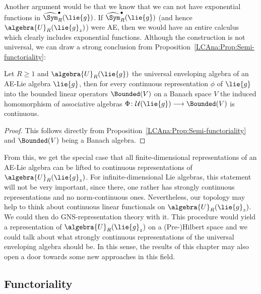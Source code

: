 Another argument would be that we know that we can not have exponential 
functions in $\widehat{\Sym}_R^{\bullet}(\lie{g})$. If 
$\widehat{\Sym}_R^{\bullet}(\lie{g})$ (and hence $\algebra{U}_R(\lie{g}_z)$) 
were AE, then we would have an entire calculus which clearly includes 
exponential functions. Although the construction is not universal, we can draw 
a strong conclusion from Proposition~\ref{LCAna:Prop:Semi-functoriality}:
\begin{corollary}
    \label{LCAna:Coro:ContinuousRepresentations}%
    Let $R \geq 1$ and $\algebra{U}_R(\lie{g})$ the universal
    enveloping algebra of an AE-Lie algebra $\lie{g}$, then for every
    continuous representation $\phi$ of $\lie{g}$ into the bounded
    linear operators $\Bounded(V)$ on a Banach space $V$ the induced
    homomorphism of associative algebras $\Phi \colon
    \mathcal{U}(\lie{g}) \longrightarrow \Bounded(V)$ is continuous.
\end{corollary}
\begin{proof}
    This follows directly from
    Proposition~\ref{LCAna:Prop:Semi-functoriality} and $\Bounded(V)$
    being a Banach algebra.
\end{proof}
\begin{remark}
	From this, we get the special case that all finite-dimensional 
	representations of an AE-Lie algebra can be lifted to continuous 
	representations of $\algebra{U}_R(\lie{g}_z)$. 
	For infinite-dimensional Lie algebras, this statement will not be very 
	important, since there, one rather has strongly continuous 
	representations and no norm-continuous ones. Nevertheless, our 
	topology may help to think about continuous linear functionals on 
	$\algebra{U}_R(\lie{g}_z)$. We could then do GNS-representation 
	theory with it. This procedure would yield a representation of 
	$\algebra{U}_R(\lie{g}_z)$ on a (Pre-)Hilbert space and we could talk 
	about what strongly continuous representations of the universal 
	enveloping algebra should be. In this sense, the results of this 
	chapter may also open a door towards some new approaches in this field.
\end{remark}



\subsection{Functoriality}

